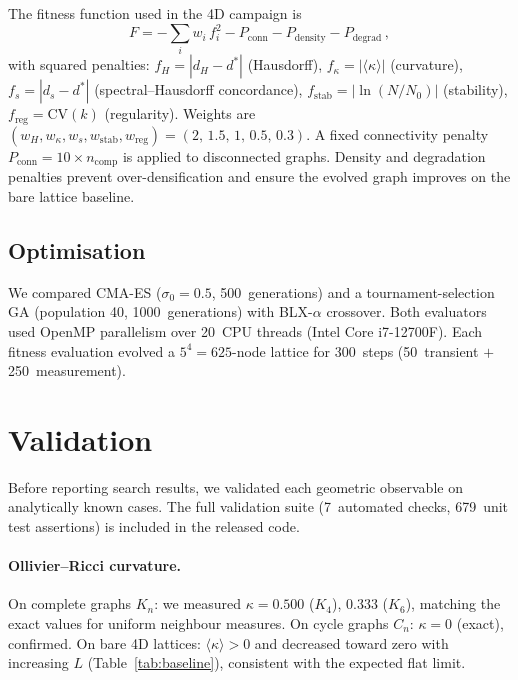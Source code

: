 \documentclass[aps,prd,twocolumn,superscriptaddress,floatfix]{revtex4-2}
\begin{document}
The fitness function used in the 4D campaign is
\begin{equation}
  F = -\sum_i w_i \, f_i^2 - P_{\mathrm{conn}} -
      P_{\mathrm{density}} - P_{\mathrm{degrad}} \,,
\label{eq:fitnessv3}
\end{equation}
with squared penalties:
$f_H = |d_H - d^*|$ (Hausdorff),
$f_\kappa = |\langle\kappa\rangle|$ (curvature),
$f_s = |d_s - d^*|$ (spectral--Hausdorff concordance),
$f_{\mathrm{stab}} = |\ln(N/N_0)|$ (stability),
$f_{\mathrm{reg}} = \mathrm{CV}(k)$ (regularity).
Weights are $(w_H, w_\kappa, w_s, w_{\mathrm{stab}},
w_{\mathrm{reg}}) = (2,\, 1.5,\, 1,\, 0.5,\, 0.3)$.
A fixed connectivity penalty $P_{\mathrm{conn}} = 10 \times
n_{\mathrm{comp}}$ is applied to disconnected graphs.
Density and degradation penalties prevent over-densification and
ensure the evolved graph improves on the bare lattice baseline.

\subsection{Optimisation}
\label{sec:optimisation}

We compared CMA-ES ($\sigma_0 = 0.5$, 500~generations) and a
tournament-selection GA (population 40, 1000~generations) with
BLX-$\alpha$ crossover.  Both evaluators used OpenMP parallelism
over 20~CPU threads (Intel Core i7-12700F).  Each fitness
evaluation evolved a $5^4 = 625$-node lattice for 300~steps
(50~transient $+$ 250~measurement).


\section{Validation}
\label{sec:validation}

Before reporting search results, we validated each geometric
observable on analytically known cases.  The full validation suite
(7~automated checks, 679~unit test assertions) is included in the
released code.

\paragraph{Ollivier--Ricci curvature.}
On complete graphs $K_n$: we measured
$\kappa = 0.500$ ($K_4$), $0.333$ ($K_6$), matching the exact
values for uniform neighbour measures.
On cycle graphs $C_n$: $\kappa = 0$ (exact), confirmed.
On bare 4D lattices: $\langle\kappa\rangle > 0$ and decreased
toward zero with increasing $L$ (Table~\ref{tab:baseline}),
consistent with the expected flat limit.
\end{document}
